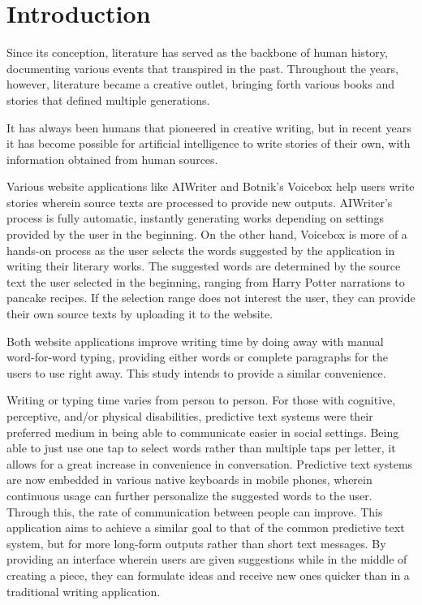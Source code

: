 \documentclass[journal]{./IEEE/IEEEtran}
\title{\SPTITLE}
\author{\ADVISEE
\REMARK
}
\begin{document}
\maketitle

\section{Introduction}
Since its conception, literature has served as the backbone of human history, documenting various events that transpired in the past. Throughout the years, however, literature became a creative outlet, bringing forth various books and stories that defined multiple generations.

It has always been humans that pioneered in creative writing, but in recent years it has become possible for artificial intelligence to write stories of their own, with information obtained from human sources.

Various website applications like AIWriter\cite{AIWriter} and Botnik's Voicebox\cite{Voicebox} help users write stories wherein source texts are processed to provide new outputs. AIWriter's process is fully automatic, instantly generating works depending on settings provided by the user in the beginning. On the other hand, Voicebox is more of a hands-on process as the user selects the words suggested by the application in writing their literary works. The suggested words are determined by the source text the user selected in the beginning, ranging from Harry Potter narrations to pancake recipes. If the selection range does not interest the user, they can provide their own source texts by uploading it to the website.

Both website applications improve writing time by doing away with manual word-for-word typing, providing either words or complete paragraphs for the users to use right away. This study intends to provide a similar convenience.

Writing or typing time varies from person to person. For those with cognitive, perceptive, and/or physical disabilities, predictive text systems were their preferred medium in being able to communicate easier in social settings. \cite{GV2006} Being able to just use one tap to select words rather than multiple taps per letter, it allows for a great increase in convenience in conversation. Predictive text systems are now embedded in various native keyboards in mobile phones, wherein continuous usage can further personalize the suggested words to the user. Through this, the rate of communication between people can improve. This application aims to achieve a similar goal to that of the common predictive text system, but for more long-form outputs rather than short text messages. By providing an interface wherein users are given suggestions while in the middle of creating a piece, they can formulate ideas and receive new ones quicker than in a traditional writing application.
\end{document}
